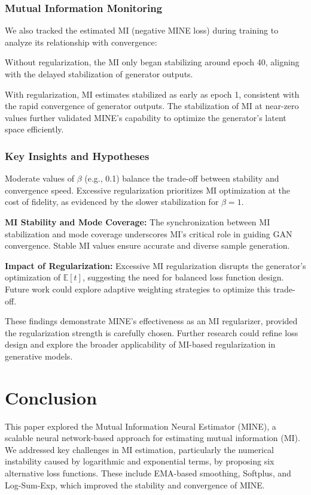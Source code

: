 \documentclass[lettersize,journal]{IEEEtran}
\begin{document}
\subsubsection{Mutual Information Monitoring}
We also tracked the estimated MI (negative MINE loss) during training to analyze its relationship with convergence:

Without regularization, the MI only began stabilizing around epoch 40, aligning with the delayed stabilization of generator outputs.

With regularization, MI estimates stabilized as early as epoch 1, consistent with the rapid convergence of generator outputs. The stabilization of MI at near-zero values further validated MINE's capability to optimize the generator's latent space efficiently.

\subsubsection{Key Insights and Hypotheses}  
Moderate values of \( \beta \) (e.g., 0.1) balance the trade-off between stability and convergence speed. Excessive regularization prioritizes MI optimization at the cost of fidelity, as evidenced by the slower stabilization for \( \beta = 1 \).

\textbf{MI Stability and Mode Coverage:} The synchronization between MI stabilization and mode coverage underscores MI's critical role in guiding GAN convergence. Stable MI values ensure accurate and diverse sample generation.

\textbf{Impact of Regularization:} Excessive MI regularization disrupts the generator's optimization of \( \mathbb{E}[t] \), suggesting the need for balanced loss function design. Future work could explore adaptive weighting strategies to optimize this trade-off.

These findings demonstrate MINE's effectiveness as an MI regularizer, provided the regularization strength is carefully chosen. Further research could refine loss design and explore the broader applicability of MI-based regularization in generative models.

\section{Conclusion}

This paper explored the Mutual Information Neural Estimator (MINE), a scalable neural network-based approach for estimating mutual information (MI). We addressed key challenges in MI estimation, particularly the numerical instability caused by logarithmic and exponential terms, by proposing six alternative loss functions. These include EMA-based smoothing, Softplus, and Log-Sum-Exp, which improved the stability and convergence of MINE.
\end{document}
